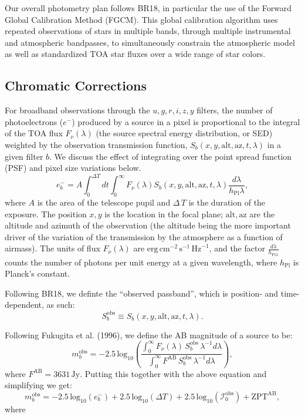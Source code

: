 \documentclass[SE,authoryear,lsstdraft,toc]{lsstdoc}
\newcommand{\etron}{e^{-}}
\newcommand{\mobs}{m_b^{\mathrm{obs}}}
\newcommand{\Sobs}{S_b^{\mathrm{obs}}}
\newcommand{\Iobs}{\mathcal{I}_0^{\mathrm{obs}}}
\begin{document}
Our overall photometry plan follows BR18, in particular the use of the Forward
Global Calibration Method (FGCM).  This global calibration algorithm uses
repeated observations of stars in multiple bands, through multiple instrumental
and atmospheric bandpasses, to simultaneously constrain the atmospheric model
as well as standardized TOA star fluxes over a wide range of star colors.

\subsection{Chromatic Corrections}

For broadband observations through the ${u,g,r,i,z,y}$ filters, the number of
photoelectrons ($\etron$) produced by a source in a pixel is proportional to the
integral of the TOA flux $F_\nu(\lambda)$ (the source spectral energy
distribution, or SED) weighted by the observation
transmission function, $S_b(x, y, \mathrm{alt}, \mathrm{az}, t, \lambda)$ in a
given filter $b$.  We discuss the effect of integrating over the point spread
function (PSF) and pixel size variations below.
%
\begin{equation}
\etron_b = A \int_0^{\Delta T}dt \int_0^\infty
F_\nu(\lambda) S_b(x, y, \mathrm{alt}, \mathrm{az}, t, \lambda)
\frac{d\lambda}{h_{\mathrm{Pl}}\lambda},
\end{equation}
%
where $A$ is the area of the telescope pupil and $\Delta\,T$ is the duration of
the exposure.  The position ${x, y}$ is the location in the focal plane;
${\mathrm{alt}, \mathrm{az}}$ are the altitude and azimuth of the observation
(the altitude being the more important driver of the variation of the
transmission by the atmosphere as a function of airmass).  The units of flux
$F_\nu(\lambda)$ are
$\mathrm{erg}\,\mathrm{cm}^{-2}\,\mathrm{s}^{-1}\,\mathrm{Hz}^{-1}$, and the
factor $\frac{d\lambda}{h_{\mathrm{Pl}\lambda}}$ counts the number of photons
per unit energy at a given wavelength, where $h_{\mathrm{Pl}}$ is Planck's
constant.

Following BR18, we definte the ``observed passband'', which is position- and
time-dependent, as such:
%
\begin{equation}
\Sobs \equiv S_b(x, y, \mathrm{alt}, \mathrm{az}, t, \lambda).
\end{equation}

Following Fukugita et al. (1996), we define the AB magnitude of a source to be:
%
\begin{equation}
\mobs = -2.5\,\mathrm{log}_{10} \left ( \frac{\int_0^{\infty}
  F_\nu(\lambda)\,\Sobs\,\lambda^{-1}d\lambda}{\int_0^{\infty}
  F^{\mathrm{AB}}\,\Sobs\,\lambda^{-1}d\lambda} \right ),
\end{equation}
%
where $F^{\mathrm{AB}} = 3631\,\mathrm{Jy}$.  Putting this together with the
above equation and simplifying we get:
%
\begin{equation}
\mobs = -2.5\,\mathrm{log}_{10}(\etron_b) +
2.5\,\mathrm{log}_{10}({\Delta}T) + 2.5\,\mathrm{log}_{10}(\Iobs) +
\mathrm{ZPT}^{\mathrm{AB}},
\end{equation}
%
where
\end{document}
